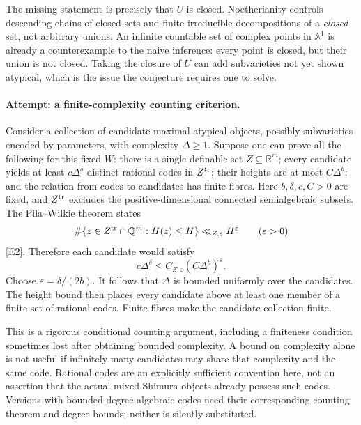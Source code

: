\documentclass[11pt,a4paper]{article}
\numberwithin{equation}{section}
\newcommand{\Q}{\mathbb{Q}}
\newcommand{\R}{\mathbb{R}}
\newcommand{\A}{\mathbb{A}}
\newcommand{\eref}[2]{\hyperlink{extra:#1:#2}{[E#2]}}
\begin{document}
The missing statement is precisely that $U$ is closed. Noetherianity
controls descending chains of closed sets and finite irreducible
decompositions of a \emph{closed} set, not arbitrary unions. An infinite
countable set of complex points in $\A^1$ is already a counterexample to
the naive inference: every point is closed, but their union is not closed.
Taking the closure of $U$ can add subvarieties not yet shown atypical,
which is the issue the conjecture requires one to solve.

\paragraph{Attempt: a finite-complexity counting criterion.}
Consider a collection of candidate maximal atypical objects, possibly
subvarieties encoded by parameters, with complexity $\Delta\geq1$.
Suppose one can prove all the following for this fixed $W$: there is a
single definable set $Z\subseteq\R^m$; every candidate yields at least
$c\Delta^\delta$ distinct rational codes in $Z^{\rm tr}$; their heights
are at most $C\Delta^b$; and the relation from codes to candidates has
finite fibres. Here $b,\delta,c,C>0$ are fixed, and $Z^{\rm tr}$ excludes
the positive-dimensional connected semialgebraic subsets.
The Pila--Wilkie theorem states
\[
 \#\{z\in Z^{\rm tr}\cap\Q^m:H(z)\leq H\}\ll_{Z,\varepsilon}H^\varepsilon
 \qquad(\varepsilon>0)
\]
\eref{statement}{2}. Therefore each candidate would satisfy
\[
 c\Delta^\delta\leq C_{Z,\varepsilon}(C\Delta^b)^\varepsilon.
\]
Choose $\varepsilon=\delta/(2b)$. It follows that $\Delta$ is bounded
uniformly over the candidates. The height bound then places every candidate
above at least one member of a finite set of rational codes. Finite fibres
make the candidate collection finite.

This is a rigorous conditional counting argument, including a finiteness
condition sometimes lost after obtaining bounded complexity. A bound on
complexity alone is not useful if infinitely many candidates may share
that complexity and the same code. Rational codes are an explicitly
sufficient convention here, not an assertion that the actual mixed Shimura
objects already possess such codes. Versions with bounded-degree algebraic
codes need their corresponding counting theorem and degree bounds; neither
is silently substituted.
\end{document}
